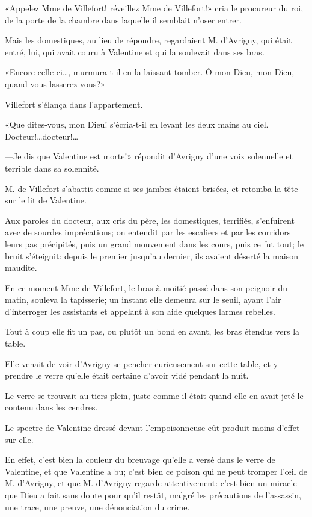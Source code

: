 «Appelez Mme de Villefort! réveillez Mme de Villefort!» cria le procureur du roi, de la porte de la chambre dans laquelle il semblait n'oser entrer. 

Mais les domestiques, au lieu de répondre, regardaient M. d'Avrigny, qui était entré, lui, qui avait couru à Valentine et qui la soulevait dans ses bras. 

«Encore celle-ci\dots, murmura-t-il en la laissant tomber. Ô mon Dieu, mon Dieu, quand vous lasserez-vous?» 

Villefort s'élança dans l'appartement. 

«Que dites-vous, mon Dieu! s'écria-t-il en levant les deux mains au ciel. Docteur!\dots docteur!\dots 

—Je dis que Valentine est morte!» répondit d'Avrigny d'une voix solennelle et terrible dans sa solennité. 

M. de Villefort s'abattit comme si ses jambes étaient brisées, et retomba la tête sur le lit de Valentine. 

Aux paroles du docteur, aux cris du père, les domestiques, terrifiés, s'enfuirent avec de sourdes imprécations; on entendit par les escaliers et par les corridors leurs pas précipités, puis un grand mouvement dans les cours, puis ce fut tout; le bruit s'éteignit: depuis le premier jusqu'au dernier, ils avaient déserté la maison maudite. 

En ce moment Mme de Villefort, le bras à moitié passé dans son peignoir du matin, souleva la tapisserie; un instant elle demeura sur le seuil, ayant l'air d'interroger les assistants et appelant à son aide quelques larmes rebelles. 

Tout à coup elle fit un pas, ou plutôt un bond en avant, les bras étendus vers la table. 

Elle venait de voir d'Avrigny se pencher curieusement sur cette table, et y prendre le verre qu'elle était certaine d'avoir vidé pendant la nuit. 

Le verre se trouvait au tiers plein, juste comme il était quand elle en avait jeté le contenu dans les cendres. 

Le spectre de Valentine dressé devant l'empoisonneuse eût produit moins d'effet sur elle. 

En effet, c'est bien la couleur du breuvage qu'elle a versé dans le verre de Valentine, et que Valentine a bu; c'est bien ce poison qui ne peut tromper l'œil de M. d'Avrigny, et que M. d'Avrigny regarde attentivement: c'est bien un miracle que Dieu a fait sans doute pour qu'il restât, malgré les précautions de l'assassin, une trace, une preuve, une dénonciation du crime. 

